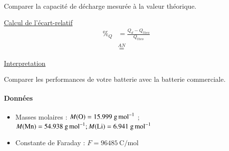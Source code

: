 \documentclass[twoside,a4paper,11pt,addpoints]{exam}%
\newcounter{foo} %
\begin{document}
\begin{questions}
\begin{mybox}
\begin{solution}[3cm]
\end{solution}\end{mybox}

\question[\half] Comparer la capacité de décharge mesurée à la valeur théorique.

\begin{mybox}
\begin{solution}[3cm]
\underline{Calcul de l'écart-relatif}
\begin{align*}
\%_Q &=  \frac{Q_d - Q_{theo}}{Q_{theo}} \\
&\stackrel{AN}{=}
\end{align*}

\underline{Interpretation}

\end{solution}\end{mybox}

\question[1] Comparer les performances de votre batterie avec la batterie commerciale.

\begin{mybox}
\begin{solution}[8cm]


\end{solution}\end{mybox}

\setcounter{foo}{\value{question}}
\end{questions}

\paragraph*{Données}
\begin{itemize}
\item Masses molaires : $M(\ce{O}) = 15.999 ~ \si{\gram\per\mole}$ ; $M(\ce{Mn}) = 54.938 ~ \si{\gram\per\mole}; M(\ce{Li}) = 6.941 ~ \si{\gram\per\mole}$
\item Constante de Faraday : $F = 96485 ~ \si{\coulomb\per\mole}$

\end{itemize}
\end{document}
